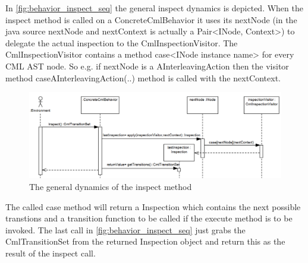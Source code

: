 \documentclass[a4paper, 10pt]{include/compassreport}   %
\begin{document}
In \autoref{fig:behavior_inspect_seq} the general inspect dynamics is
depicted. When the inspect method is called on a ConcreteCmlBehavior
it uses its nextNode (in the java source nextNode and nextContext is
actually a Pair<INode, Context>) to delegate the actual inspection to
the CmlInspectionVisitor. The CmlInspectionVisitor contains a method
case<INode instance name> for every CML AST node. So e.g. if nextNode
is a AInterleavingAction then the visitor method
caseAInterleavingAction(..) method is called with the nextContext.
\begin{figure}[ht!]
  \begin{center}
    \includegraphics[width=1\textwidth]{figures/behavior-inspect-seq}
    \caption{The general dynamics of the inspect method}
    \label{fig:behavior_inspect_seq}
  \end{center}
\end{figure}
The called case method will return a Inspection which contains the
next possible transtions and a transition function to be called if the
execute method is to be invoked. The last call in
\autoref{fig:behavior_inspect_seq} just grabs the CmlTransitionSet
from the returned Inspection object and return this as the result of
the inspect call.
\end{document}
